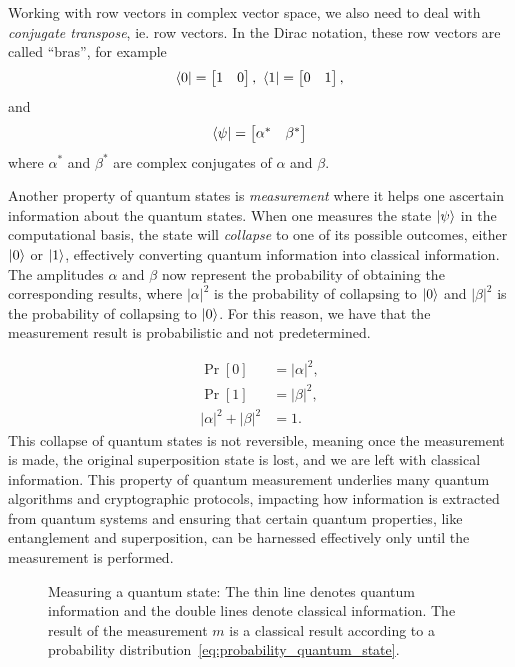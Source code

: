 \documentclass[cryptography,review,submit,pdftex,moreauthors,amsmath,amssymb,aps,strict]{Definitions/mdpi}
\begin{document}
Working with row vectors in complex vector space, we also need to deal with \textit{conjugate transpose}, ie. row vectors. In the Dirac notation, these row vectors are called ``bras'', for example
\begin{align}
    \bra{0}= \begin{bmatrix} 1 & 0 \end{bmatrix} \text{, }\bra{1}=\begin{bmatrix} 0 & 1
\end{bmatrix},
\end{align}
and 
\begin{align}
    \bra{\psi}=  \begin{bmatrix} \alpha^* & \beta^*\end{bmatrix}
\end{align}
where $\alpha^*$ and $\beta^*$ are complex conjugates of $\alpha$ and $\beta$.

Another property of quantum states is \textit{measurement} where it helps one ascertain information about the quantum states. When one measures the state $\ket{\psi}$ in the computational basis, the state will \textit{collapse} to one of its possible outcomes, either $\ket{0}$ or $\ket{1}$, effectively converting quantum information into classical information. The amplitudes $\alpha$ and $\beta$ now represent the probability of obtaining the corresponding results, where $|\alpha|^2$ is the probability of collapsing to $\ket{0}$ and $|\beta|^2$  is the probability of collapsing to $\ket{0}$. For this reason, we have that the measurement result is probabilistic and not predetermined.

\begin{align}
\Pr[0] &= |\alpha|^2,\nonumber\\
\Pr[1] &= |\beta|^2,\nonumber\\
|\alpha|^2 + |\beta|^2 &= 1.
\label{eq:probability_quantum_state}
\end{align}
This collapse of quantum states is not reversible, meaning once the measurement is made, the original superposition state is lost, and we are left with classical information. This property of quantum measurement underlies many quantum algorithms and cryptographic protocols, impacting how information is extracted from quantum systems and ensuring that certain quantum properties, like entanglement and superposition, can be harnessed effectively only until the measurement is performed.

\begin{figure}[h]
    \center
    
    \caption{Measuring a quantum state:  The thin line denotes quantum information and the double lines denote classical information. The result of the measurement $m$ is a classical result according to a probability distribution~\eqref{eq:probability_quantum_state}.}
    \label{fig:measurement}
\end{figure}
\end{document}
